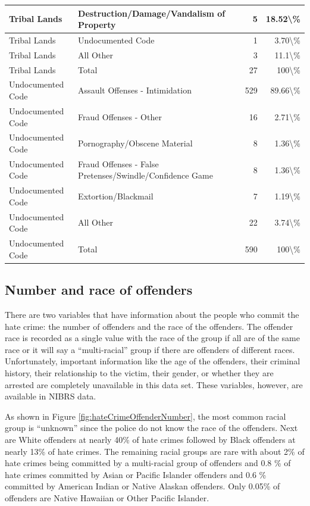 \documentclass[
]{krantz}
\begin{document}
\begin{longtable}[t]{l|l|r|r}
\hline
Tribal Lands & Destruction/Damage/Vandalism of Property & 5 & 18.52\textbackslash{}\%\\
\hline
Tribal Lands & Undocumented Code & 1 & 3.70\textbackslash{}\%\\
\hline
Tribal Lands & All Other & 3 & 11.1\textbackslash{}\%\\
\hline
Tribal Lands & Total & 27 & 100\textbackslash{}\%\\
\hline
Undocumented Code & Assault Offenses - Intimidation & 529 & 89.66\textbackslash{}\%\\
\hline
Undocumented Code & Fraud Offenses - Other & 16 & 2.71\textbackslash{}\%\\
\hline
Undocumented Code & Pornography/Obscene Material & 8 & 1.36\textbackslash{}\%\\
\hline
Undocumented Code & Fraud Offenses - False Pretenses/Swindle/Confidence Game & 8 & 1.36\textbackslash{}\%\\
\hline
Undocumented Code & Extortion/Blackmail & 7 & 1.19\textbackslash{}\%\\
\hline
Undocumented Code & All Other & 22 & 3.74\textbackslash{}\%\\
\hline
Undocumented Code & Total & 590 & 100\textbackslash{}\%\\
\hline
\end{longtable}

\subsection{Number and race of
offenders}\label{number-and-race-of-offenders}

There are two variables that have information about the
people who commit the hate crime: the number of offenders
and the race of the offenders. The offender race is recorded
as a single value with the race of the group if all are of
the same race or it will say a ``multi-racial'' group if
there are offenders of different races. Unfortunately,
important information like the age of the offenders, their
criminal history, their relationship to the victim, their
gender, or whether they are arrested are completely
unavailable in this data set. These variables, however, are
available in NIBRS data.

As shown in Figure \ref{fig:hateCrimeOffenderNumber}, the
most common racial group is ``unknown'' since the police do
not know the race of the offenders. Next are White offenders
at nearly 40\% of hate crimes followed by Black offenders at
nearly 13\% of hate crimes. The remaining racial groups are
rare with about 2\% of hate crimes being committed by a
multi-racial group of offenders and 0.8 \% of hate crimes
committed by Asian or Pacific Islander offenders and 0.6 \%
committed by American Indian or Native Alaskan offenders.
Only 0.05\% of offenders are Native Hawaiian or Other
Pacific Islander.
\end{document}

